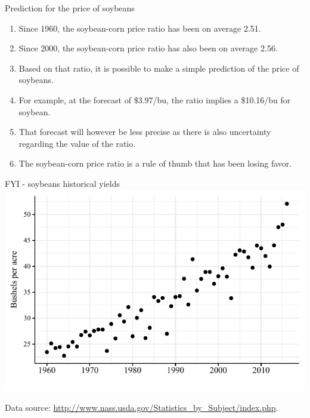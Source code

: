 \documentclass[table,xcolor=pdftex,dvipsnames, handout]{beamer}\usepackage[]{graphicx}\usepackage[]{color}
\makeatletter
\def\maxwidth{ %
  \ifdim\Gin@nat@width>\linewidth
    \linewidth
  \else
    \Gin@nat@width
  \fi
}
\newenvironment{knitrout}{}{} %
\makeatother
\begin{document}

\begin{frame}{Prediction for the price of soybeans}
\begin{enumerate}[label=\textbullet]
  \item Since 1960, the soybean-corn price ratio has been on average 2.51.
  \item Since 2000, the soybean-corn price ratio has also been on average 2.56.
  \item Based on that ratio, it is possible to make a simple prediction of the price of soybeans.
  \item For example, at the forecast of \$3.97/bu, the ratio implies a \$10.16/bu for soybean.
  \item That forecast will however be less precise as there is also uncertainty regarding the value of the ratio.
  \item The soybean-corn price ratio is a rule of thumb that has been losing favor.
\end{enumerate}
\end{frame}


\begin{frame}{FYI - soybeans historical yields}
\begin{knitrout}
\color{fgcolor}
\includegraphics[width=\maxwidth]{figure/figure_soybean_yield-1} 

\end{knitrout}
\scriptsize
Data source: \url{http://www.nass.usda.gov/Statistics_by_Subject/index.php}.
\end{frame}
\end{document}
